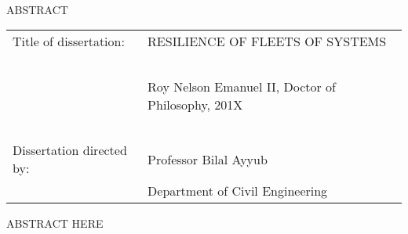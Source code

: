 
\hbox{\ }

\renewcommand{\baselinestretch}{1}
\small \normalsize

\begin{center}
\large{{ABSTRACT}} 

\vspace{3em} 

\end{center}
\hspace{-.15in}
\begin{tabular}{ll}
Title of dissertation:    & {\large  RESILIENCE OF FLEETS OF SYSTEMS }\\
\ \\
&                          {\large  Roy Nelson Emanuel II, Doctor of Philosophy, 201X} \\
\ \\
Dissertation directed by: & {\large  Professor Bilal Ayyub} \\
&  				{\large	 Department of Civil Engineering } \\
\end{tabular}

\vspace{3em}

\renewcommand{\baselinestretch}{2}
\large \normalsize

ABSTRACT HERE


